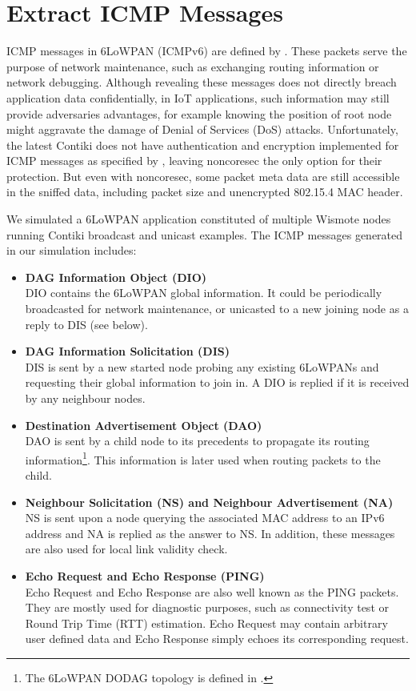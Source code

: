 \section{Extract ICMP Messages}\label{ICMPAttack}
ICMP messages in 6LoWPAN (ICMPv6) are defined by \cite{rfc4443}. These packets serve the purpose of network maintenance, such as exchanging routing information or network debugging. Although revealing these messages does not directly breach application data confidentially, in IoT applications, such information may still provide adversaries advantages, for example knowing the position of root node might aggravate the damage of Denial of Services (DoS) attacks. Unfortunately, the latest Contiki does not have authentication and encryption implemented for ICMP messages as specified by \cite{rfc2463}, leaving noncoresec the only option for their protection. But even with noncoresec, some packet meta data are still accessible in the sniffed data, including packet size and unencrypted 802.15.4 MAC header.

We simulated a 6LoWPAN application constituted of multiple Wismote\cite{Wismote} nodes running Contiki broadcast and unicast examples. The ICMP messages generated in our simulation includes:
\begin{itemize}
	\item \textbf{DAG Information Object (DIO)} \\
	DIO contains the 6LoWPAN global information. It could be periodically broadcasted for network maintenance, or unicasted to a new joining node as a reply to DIS (see below).
	\item \textbf{DAG Information Solicitation (DIS)} \\
	DIS is sent by a new started node probing any existing 6LoWPANs and requesting their global information to join in. A DIO is replied if it is received by any neighbour nodes.
	\item \textbf{Destination Advertisement Object (DAO)} \\
	DAO is sent by a child node to its precedents to propagate its routing information\footnote{The 6LoWPAN DODAG topology is defined in \cite{rfc6550}.}. This information is later used when routing packets to the child.
	\item \textbf{Neighbour Solicitation (NS) and Neighbour Advertisement (NA)} \\
	NS is sent upon a node querying the associated MAC address to an IPv6 address and NA is replied as the answer to NS. In addition, these messages are also used for local link validity check.
	\item \textbf{Echo Request and Echo Response (PING)} \\
	Echo Request and Echo Response are also well known as the PING packets. They are mostly used for diagnostic purposes, such as connectivity test or Round Trip Time (RTT) estimation. Echo Request may contain arbitrary user defined data and Echo Response simply echoes its corresponding request.
\end{itemize}

